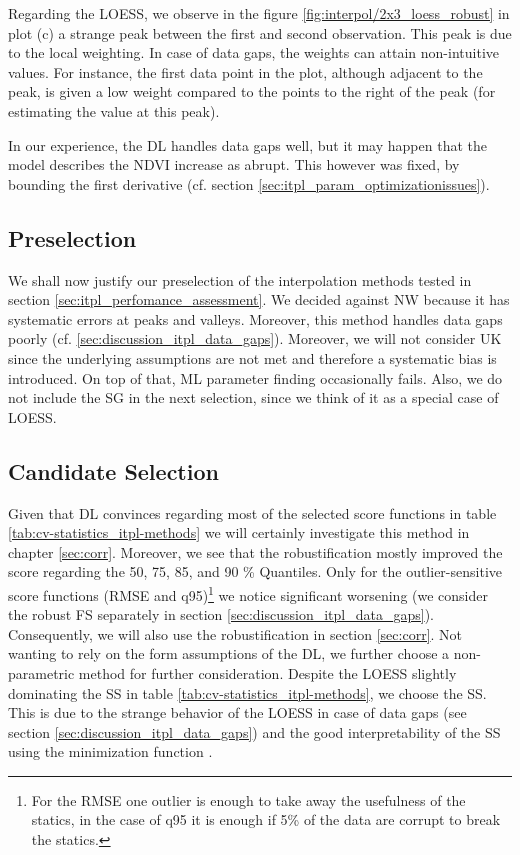 {{        Regarding the LOESS, we observe in the figure \ref{fig:interpol/2x3_loess_robust} in plot (c) a strange peak between the first and second observation. This peak is due to the local weighting. In case of data gaps, the weights can attain non-intuitive values. For instance, the first data point in the plot, although adjacent to the peak, is given a low weight compared to the points to the right of the peak (for estimating the value at this peak).

        In our experience, the DL handles data gaps well, but it may happen that the model describes the NDVI increase as abrupt. This however was fixed, by bounding the first derivative (cf. section \ref{sec:itpl_param_optimizationissues}).
    }

    \subsection{Preselection}{\label{sec:itpl_preselection}
        We shall now justify our preselection of the interpolation methods tested in section \ref{sec:itpl_perfomance_assessment}. 
        We decided against NW because it has systematic errors at peaks and valleys. Moreover, this method handles data gaps poorly (cf. \ref{sec:discussion_itpl_data_gaps}). 
        Moreover, we will not consider UK since the underlying assumptions are not met and therefore a systematic bias is introduced. On top of that, ML parameter finding occasionally fails.
        Also, we do not include the SG in the next selection, since we think of it as a special case of LOESS.
    }

    \subsection{Candidate Selection}{\label{sec:itpl_candiate_selection}
        Given that DL convinces regarding most of the selected score functions in table \ref{tab:cv-statistics_itpl-methods} we will certainly investigate this method in chapter \ref{sec:corr}. Moreover, we see that the robustification mostly improved the score regarding the 50, 75, 85, and 90 \% Quantiles. Only for the outlier-sensitive score functions (RMSE and q95)\footnote{For the RMSE one outlier is enough to take away the usefulness of the statics, in the case of q95 it is enough if 5\% of the data are corrupt to break the statics.} we notice significant worsening (we consider the robust FS separately in section \ref{sec:discussion_itpl_data_gaps}). Consequently, we will also use the robustification in section \ref{sec:corr}.
        Not wanting to rely on the form assumptions of the DL, we further choose a non-parametric method for further consideration. Despite the LOESS slightly dominating the SS in table \ref{tab:cv-statistics_itpl-methods}, we choose the SS. This is due to the strange behavior of the LOESS in case of data gaps (see section \ref{sec:discussion_itpl_data_gaps}) and the good interpretability of the SS using the minimization function .
    }


}

